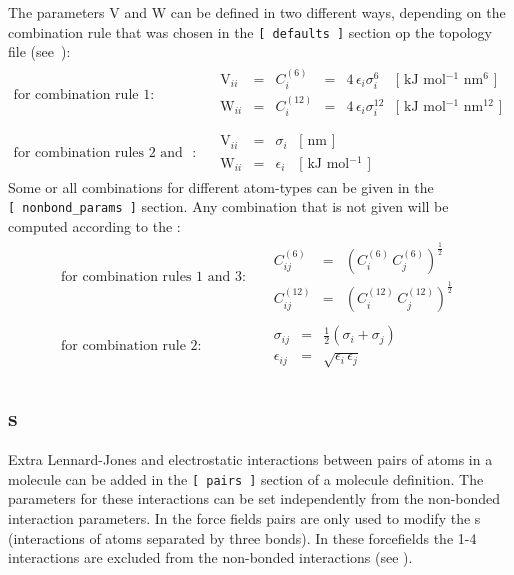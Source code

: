 The parameters V and W can be defined in two different ways, depending on
the combination rule that was chosen in the {\tt [~defaults~]} section
op the topology file (see~):
\begin{eqnarray}
\mbox{for combination rule 1}: & &
\begin{array}{llllll}
  \mbox{V}_{ii} & = & C^{(6)}_{i}  & = & 4\,\epsilon_i\sigma_i^{6} &
  \mbox{[ kJ mol$^{-1}$ nm$^{6}$ ]}\\
  \mbox{W}_{ii} & = & C^{(12)}_{i} & = & 4\,\epsilon_i\sigma_i^{12} &
  \mbox{[ kJ mol$^{-1}$ nm$^{12}$ ]}\\
\end{array}
\\
\mbox{for combination rules 2 and 3}: & &
\begin{array}{llll}
  \mbox{V}_{ii} & = & \sigma_i   & \mbox{[ nm ]} \\
  \mbox{W}_{ii} & = & \epsilon_i & \mbox{[ kJ mol$^{-1}$ ]}
\end{array}
\end{eqnarray}
Some or all combinations for different atom-types can be given in
the {\tt [~nonbond\_params~]} section. Any combination that is
not given will be 
computed according to the :
\begin{eqnarray}
\mbox{for combination rules 1 and 3}: & &
\begin{array}{lll}
  C^{(6)}_{ij}  & = & \left(C^{(6)}_i\,C^{(6)}_j\right)^{\frac{1}{2}} \\
  C^{(12)}_{ij} & = & \left(C^{(12)}_i\,C^{(12)}_j\right)^{\frac{1}{2}}
\end{array}
\\
\mbox{for combination rule 2}: & &
\begin{array}{lll}
  \sigma_{ij}   & = & \frac{1}{2}(\sigma_i+\sigma_j) \\
  \epsilon_{ij} & = & \sqrt{\epsilon_i\,\epsilon_j}
\end{array}
\end{eqnarray}

\subsection{s}
Extra Lennard-Jones and electrostatic interactions between pairs
of atoms in a molecule can be added in the {\tt [~pairs~]} section of
a molecule definition. The parameters for these interactions can
be set independently from the non-bonded interaction parameters.
In the {\gromos} force fields pairs are only used
to modify the s (interactions of atoms
separated by three bonds). In these forcefields the 1-4 interactions
are excluded from the non-bonded interactions (see ).

